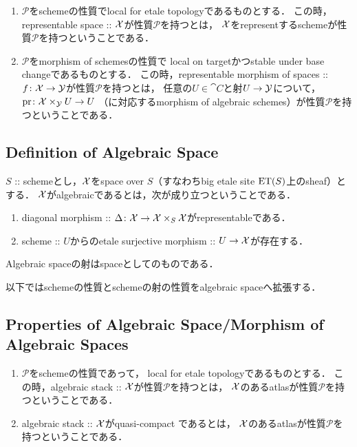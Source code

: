     \begin{Def}
        \enumfix
    \begin{enumerate}
    \item
        $\mathcal{P}$をschemeの性質でlocal for etale topologyであるものとする．
        この時，representable space :: $\mathcal{X}$が性質$\mathcal{P}$を持つとは，
        $\mathcal{X}$をrepresentするschemeが性質$\mathcal{P}$を持つということである．

    \item
        $\mathcal{P}$をmorphism of schemesの性質で
        local on targetかつstable under base changeであるものとする．
        この時，representable morphism of spaces :: $f \colon \mathcal{X} \to \mathcal{Y}$が性質$\mathcal{P}$を持つとは，
        任意の$U \in \cat{C}$と射$U \to \mathcal{Y}$について，
        $\operatorname{pr} \colon \mathcal{X} \times_{\mathcal{Y}} U \to U$
        （に対応するmorphism of algebraic schemes）が性質$\mathcal{P}$を持つということである．
    \end{enumerate}
    \end{Def}

\subsection{Definition of Algebraic Space}
    \begin{Def}
        $S$ :: schemeとし，$\mathcal{X}$をspace over $S$（すなわちbig etale site $\mathrm{ET}(S)$上のsheaf）とする．
        $\mathcal{X}$がalgebraicであるとは，次が成り立つということである．
    \begin{enumerate}
        \item diagonal morphism :: $\Delta \colon \mathcal{X} \to \mathcal{X} \times_{S} \mathcal{X}$がrepresentableである．
        \item scheme :: $U$からのetale surjective morphism :: $U \to \mathcal{X}$が存在する．
    \end{enumerate}
        Algebraic spaceの射はspaceとしてのものである．
    \end{Def}
    
以下ではschemeの性質とschemeの射の性質をalgebraic spaceへ拡張する．

\subsection{Properties of Algebraic Space/Morphism of Algebraic Spaces}
    \begin{Def}
        \enumfix
    \begin{enumerate}
    \item
        $\mathcal{P}$をschemeの性質であって，
        local for etale topologyであるものとする．
        この時，algebraic stack :: $\mathcal{X}$が性質$\mathcal{P}$を持つとは，
        $\mathcal{X}$のあるatlasが性質$\mathcal{P}$を持つということである．

    \item
        algebraic stack :: $\mathcal{X}$がquasi-compact
        であるとは，
        $\mathcal{X}$のあるatlasが性質$\mathcal{P}$を持つということである．
    \end{enumerate}
    \end{Def}

